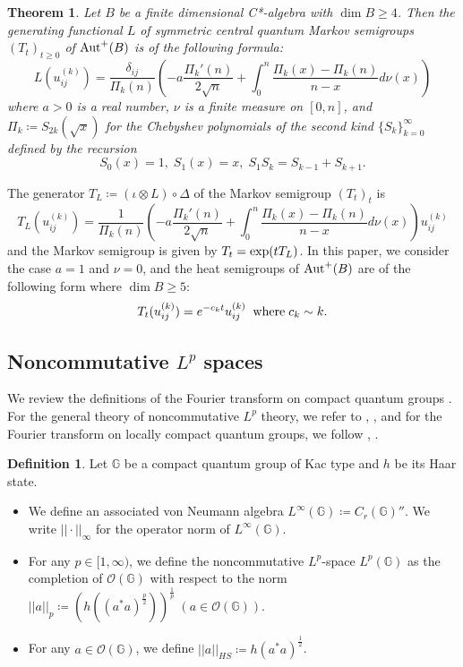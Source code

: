 \documentclass[12pt]{amsart}
\theoremstyle{plain} %
\newtheorem{theorem}[equation]{Theorem}
\theoremstyle{definition}
\newtheorem{definition}[equation]{Definition}
\theoremstyle{remark}
\begin{document}
\begin{theorem}\label{heat semigroup}
Let $B$ be a finite dimensional C*-algebra with $\dim B\geq 4$. Then the generating functional $L$ of symmetric central quantum Markov semigroups $(T_t)_{t\geq0}$ of ${\rm Aut}^+(B)$ is of the following formula:
\[L(u_{ij}^{(k)})=\frac{\delta_{ij}}{\Pi_k(n)}\left(-a\frac{\Pi_k'(n)}{2\sqrt{n}}+\int_0^n\frac{\Pi_k(x)-\Pi_k(n)}{n-x}d\nu(x)\right)\]
where $a>0$ is a real number, $\nu$ is a finite measure on $[0,n]$, and $\Pi_k\coloneqq S_{2k}(\sqrt{x})$ for the Chebyshev polynomials of the second kind $\{S_k\}_{k=0}^\infty$ defined by the recursion 
\[S_0(x)=1,\;S_1(x)=x,\;S_1S_k=S_{k-1}+S_{k+1}.\]
\end{theorem}
The generator $T_L\coloneq(\iota\otimes L)\circ\Delta$ of the Markov semigroup $(T_t)_t$ is
\[T_L(u_{ij}^{(k)})=\frac{1}{\Pi_k(n)}\left(-a\frac{\Pi_k'(n)}{2\sqrt{n}}+\int_0^n\frac{\Pi_k(x)-\Pi_k(n)}{n-x}d\nu(x)\right)u_{ij}^{(k)}\]
and the Markov semigroup is given by $T_t={\rm exp}(tT_L)$.
In this paper, we consider the case $a=1$ and $\nu=0$, and the heat semigroups of ${\rm Aut}^+(B)$ are of the following form where $\dim B\geq 5$:
\[T_t(u_{ij}^{(k)})=e^{-c_kt}u_{ij}^{(k)} \;\;{\rm where}\;c_k\sim k.\]

\subsection{Noncommutative $L^p$ spaces}

We review the definitions of the Fourier transform on compact quantum groups \cite[Section 3]{MR3602819}. For the general theory of noncommutative $L^p$ theory, we refer to \cite{Pis03}, \cite{PX}, and for the Fourier transform on locally compact quantum groups, we follow \cite[Section 5]{MR3029493}, \cite[Section 3]{MR2669427} \cite[Section 3]{MR2747963}.

\begin{definition}
 Let $\mathbb{G}$ be a compact quantum group of Kac type and $h$ be its Haar state. 
 \begin{itemize}
 \item We define an associated von Neumann algebra $L^\infty(\mathbb{G})\coloneqq C_r(\mathbb{G})''$. We write $||\cdot||_\infty$ for the operator norm of $L^\infty(\mathbb{G})$.
 \item For any $p\in [1, \infty)$, we define the noncommutative $L^p$-space $L^p(\mathbb{G})$ as the completion of $\mathcal{O}(\mathbb{G})$ with respect to the norm $||a||_p\coloneqq (h((a^*a)^{\frac{p}{2}}))^{\frac{1}{p}}\;(a\in\mathcal{O}(\mathbb{G}))$.
 \item For any $a\in \mathcal{O}(\mathbb{G})$, we define $||a||_{HS}\coloneqq h(a^*a)^{\frac{1}{2}}$.
 \end{itemize}
 \end{definition}
\end{document}
